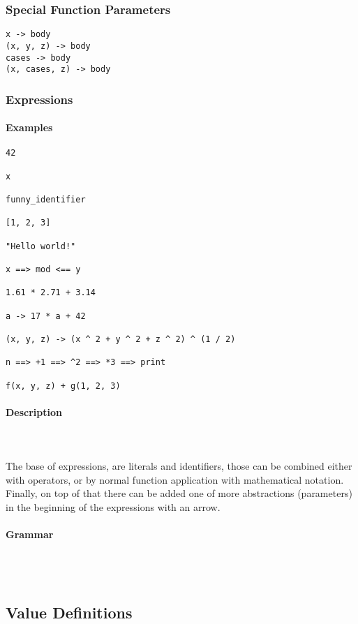 \documentclass{article}
\def\pend{\mbox{} \\\\}
\begin{document}
\subsubsection{Special Function Parameters}

\begin{verbatim}
x -> body
(x, y, z) -> body
cases -> body
(x, cases, z) -> body
\end{verbatim}

\subsubsection{Expressions}

\paragraph{Examples}

\begin{verbatim}
42

x

funny_identifier 

[1, 2, 3]

"Hello world!"

x ==> mod <== y

1.61 * 2.71 + 3.14

a -> 17 * a + 42

(x, y, z) -> (x ^ 2 + y ^ 2 + z ^ 2) ^ (1 / 2)

n ==> +1 ==> ^2 ==> *3 ==> print

f(x, y, z) + g(1, 2, 3)
\end{verbatim}

\paragraph{Description}\pend
The base of expressions, are literals and identifiers, those can be combined either
with operators, or by normal function application with mathematical notation. 
Finally, on top of that there can be added one of more abstractions (parameters)
in the beginning of the expressions with an arrow.

\paragraph{Grammar}\pend

\subsection{Value Definitions}
\end{document}
